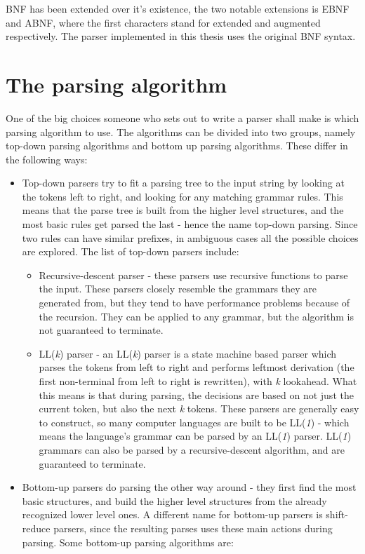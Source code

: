 BNF has been extended over it's existence, the two notable extensions is EBNF and ABNF, where the first characters stand for extended and augmented respectively. The parser implemented in this thesis uses the original BNF syntax.
\section{The parsing algorithm}
One of the big choices someone who sets out to write a parser shall make is which parsing algorithm to use. The algorithms can be divided into two groups, namely top-down parsing algorithms and bottom up parsing algorithms. These differ in the following ways:
\begin{itemize}
\item Top-down parsers try to fit a parsing tree to the input string by looking at the tokens left to right, and looking for any matching grammar rules. This means that the parse tree is built from the higher level structures, and the most basic rules get parsed the last - hence the name top-down parsing. Since two rules can have similar prefixes, in ambiguous cases all the possible choices are explored. The list of top-down parsers include:
\begin{itemize}
\item Recursive-descent parser - these parsers use recursive functions to parse the input. These parsers closely resemble the grammars they are generated from, but they tend to have performance problems because of the recursion. They can be applied to any grammar, but the algorithm is not guaranteed to terminate.
\item LL(\textit{k}) parser - an LL(\textit{k}) parser is a state machine based parser which parses the tokens from left to right and performs leftmost derivation (the first non-terminal from left to right is rewritten), with \textit{k} lookahead. What this means is that during parsing, the decisions are based on not just the current token, but also the next \textit{k} tokens. These parsers are generally easy to construct, so many computer languages are built to be LL(\textit{1}) - which means the language's grammar can be parsed by an LL(\textit{1}) parser. LL(\textit{1}) grammars can also be parsed by a recursive-descent algorithm, and are guaranteed to terminate. 
\end{itemize}
\item Bottom-up parsers do parsing the other way around - they first find the most basic structures, and build the higher level structures from the already recognized lower level ones. A different name for bottom-up parsers is shift-reduce parsers, since the resulting parses uses these main actions during parsing. Some bottom-up parsing algorithms are:

\end{itemize}
